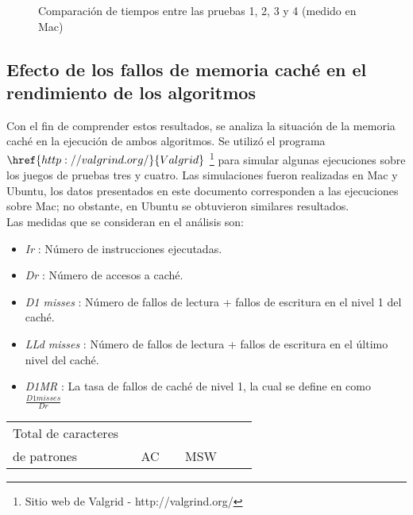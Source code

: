 {\begin{figure}[H]
\centering
\quad
\quad
\quad
\caption{Comparación de tiempos entre las pruebas 1, 2, 3 y 4 (medido en Mac)}
\label{fig:exp2_2Tab}
\end{figure}
\subsection{Efecto de los fallos de memoria caché en el rendimiento de los algoritmos}
\label{subsec:falloscache}
Con el fin de comprender estos resultados, se analiza la situación de la memoria caché en la ejecución de ambos algoritmos. Se utilizó el programa $\href{http://valgrind.org/}{Valgrid}$ \footnote{Sitio web de Valgrid - http://valgrind.org/} para simular algunas ejecuciones sobre los juegos de pruebas tres y cuatro. Las simulaciones fueron realizadas en Mac y Ubuntu, los datos presentados en este documento corresponden a las ejecuciones sobre Mac; no obstante, en Ubuntu se obtuvieron similares resultados.\\
Las medidas que se consideran en el análisis son:
\begin{itemize}
\item  {\it Ir} : Número de instrucciones ejecutadas.
\item  {\it Dr} : Número de accesos a caché.
\item  {\it D1 misses} : Número de fallos de lectura + fallos de escritura en el nivel 1 del caché.
\item  {\it LLd misses} : Número de fallos de lectura + fallos de escritura en el último nivel del caché.
\item  {\it D1MR} : La tasa de fallos de caché de nivel 1, la cual se define en \cite{bruce07} como $\frac{D1 misses}{Dr}$
\end{itemize}

\begin{table}[H]
\begin{center}
\scalebox{0.5} {
\begin{tabular}{lllllllllll}
\hline
  Total de caracteres\\ de patrones & \multicolumn{4}{c}{AC} & \multicolumn{4}{c}{MSW}\\


\end{tabular}}
\end{center}
\end{table}}

